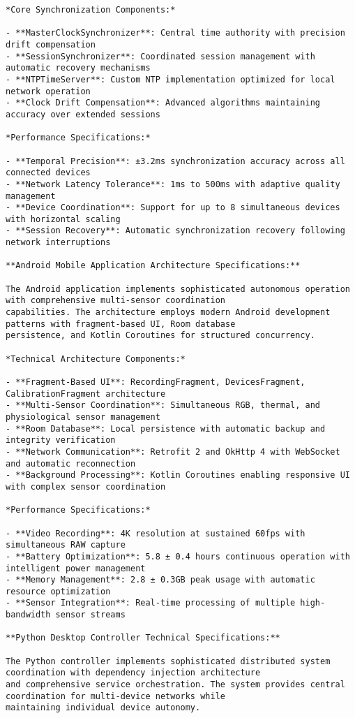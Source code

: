 \documentclass[11pt,a4paper]{report}
\begin{document}
\begin{verbatim}
*Core Synchronization Components:*

- **MasterClockSynchronizer**: Central time authority with precision drift compensation
- **SessionSynchronizer**: Coordinated session management with automatic recovery mechanisms
- **NTPTimeServer**: Custom NTP implementation optimized for local network operation
- **Clock Drift Compensation**: Advanced algorithms maintaining accuracy over extended sessions

*Performance Specifications:*

- **Temporal Precision**: ±3.2ms synchronization accuracy across all connected devices
- **Network Latency Tolerance**: 1ms to 500ms with adaptive quality management
- **Device Coordination**: Support for up to 8 simultaneous devices with horizontal scaling
- **Session Recovery**: Automatic synchronization recovery following network interruptions

**Android Mobile Application Architecture Specifications:**

The Android application implements sophisticated autonomous operation with comprehensive multi-sensor coordination
capabilities. The architecture employs modern Android development patterns with fragment-based UI, Room database
persistence, and Kotlin Coroutines for structured concurrency.

*Technical Architecture Components:*

- **Fragment-Based UI**: RecordingFragment, DevicesFragment, CalibrationFragment architecture
- **Multi-Sensor Coordination**: Simultaneous RGB, thermal, and physiological sensor management
- **Room Database**: Local persistence with automatic backup and integrity verification
- **Network Communication**: Retrofit 2 and OkHttp 4 with WebSocket and automatic reconnection
- **Background Processing**: Kotlin Coroutines enabling responsive UI with complex sensor coordination

*Performance Specifications:*

- **Video Recording**: 4K resolution at sustained 60fps with simultaneous RAW capture
- **Battery Optimization**: 5.8 ± 0.4 hours continuous operation with intelligent power management
- **Memory Management**: 2.8 ± 0.3GB peak usage with automatic resource optimization
- **Sensor Integration**: Real-time processing of multiple high-bandwidth sensor streams

**Python Desktop Controller Technical Specifications:**

The Python controller implements sophisticated distributed system coordination with dependency injection architecture
and comprehensive service orchestration. The system provides central coordination for multi-device networks while
maintaining individual device autonomy.


\end{verbatim}
\end{document}
